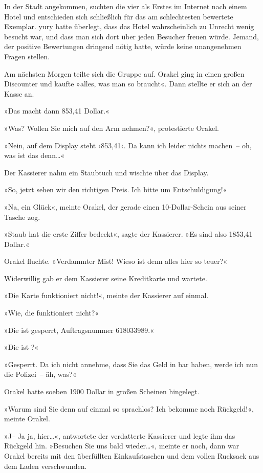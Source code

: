 In der Stadt angekommen, suchten die vier als Erstes im Internet nach einem Hotel und entschieden sich schließlich für das am schlechtesten bewertete Exemplar. yury hatte überlegt, dass das Hotel wahrscheinlich zu Unrecht wenig besucht war, und dass man sich dort über jeden Besucher freuen würde. Jemand, der positive Bewertungen dringend nötig hatte, würde keine unangenehmen Fragen stellen.

Am nächsten Morgen teilte sich die Gruppe auf. Orakel ging in einen großen Discounter und kaufte »alles, was man so braucht«. Dann stellte er sich an der Kasse an.

»Das macht dann 853,41 Dollar.«

»Was? Wollen Sie mich auf den Arm nehmen?«, protestierte Orakel.

»Nein, auf dem Display steht ›853,41‹. Da kann ich leider nichts machen~– oh, was ist das denn…«

Der Kassierer nahm ein Staubtuch und wischte über das Display.

»So, jetzt sehen wir den richtigen Preis. Ich bitte um Entschuldigung!«

»Na, ein Glück«, meinte Orakel, der gerade einen 10-Dollar-Schein aus seiner Tasche zog.

»Staub hat die erste Ziffer bedeckt«, sagte der Kassierer. »Es sind also 1853,41 Dollar.«

Orakel fluchte. »Verdammter Mist! Wieso ist denn alles hier so teuer?«

Widerwillig gab er dem Kassierer seine Kreditkarte und wartete.

»Die Karte funktioniert nicht!«, meinte der Kassierer auf einmal.

»Wie, die funktioniert nicht?«

»Die ist gesperrt, Auftragsnummer 618033989.«

»Die ist ?«

»Gesperrt. Da ich nicht annehme, dass Sie das Geld in bar haben, werde ich nun die Polizei~– äh, was?«

Orakel hatte soeben 1900 Dollar in großen Scheinen hingelegt.

»Warum sind Sie denn auf einmal so sprachlos? Ich bekomme noch Rückgeld!«, meinte Orakel.

»J– Ja ja, hier…«, antwortete der verdatterte Kassierer und legte ihm das Rückgeld hin. »Besuchen Sie uns bald wieder…«, meinte er noch, dann war Orakel bereits mit den überfüllten Einkaufstaschen und dem vollen Rucksack aus dem Laden verschwunden.

